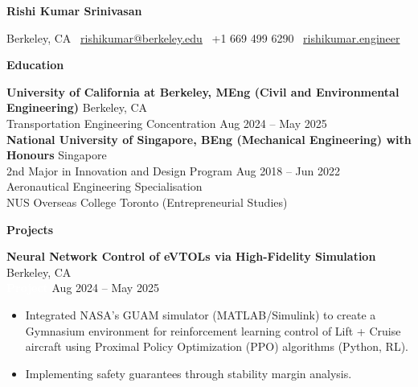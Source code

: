 \documentclass[10t]{article}
\begin{document}
\begin{center}
    \huge \textbf{Rishi Kumar Srinivasan}\\
    \hrulefill
\end{center}

\begin{center}
    Berkeley, CA \textbullet\ \href{mailto:rishikumar@berkeley.edu}{rishikumar@berkeley.edu} \textbullet\ +1 669 499 6290 \textbullet\ \href{http://www.rishikumar.engineer}{rishikumar.engineer}
\end{center}

\vspace{0.5pt}

\begin{center}
    \textbf{Education}
\end{center}
\textbf{University of California at Berkeley, MEng (Civil and Environmental Engineering)}  \hfill Berkeley, CA\\
Transportation Engineering Concentration \hfill Aug 2024 -- May 2025\\

\vspace{6pt}
\textbf{National University of Singapore, BEng (Mechanical Engineering) with Honours} \hfill Singapore\\
2nd Major in Innovation and Design Program \hfill Aug 2018 -- Jun 2022\\
Aeronautical Engineering Specialisation\\
NUS Overseas College Toronto (Entrepreneurial Studies)

\vspace{6pt}

\begin{center}
    \textbf{Projects}
\end{center}

\textbf{Neural Network Control of eVTOLs via High-Fidelity Simulation} \hfill Berkeley, CA\\
\textcolor{white}{\textbf{Project}} \hfill Aug 2024 -- May 2025
\begin{itemize}[noitemsep]
    \item Integrated NASA’s GUAM simulator (MATLAB/Simulink) to create a Gymnasium environment for reinforcement learning control of Lift + Cruise aircraft using Proximal Policy Optimization (PPO) algorithms (Python, RL).
    \item Implementing safety guarantees through stability margin analysis.
\end{itemize}
\end{document}
